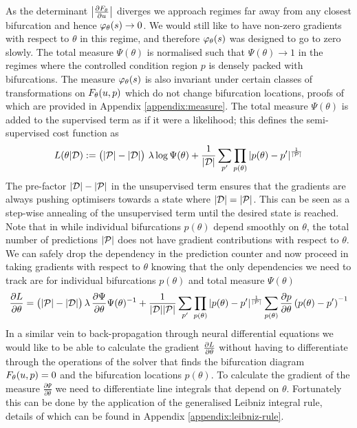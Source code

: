As the determinant $\left| \frac{\partial F_{\theta}}{\partial u} \right|$ diverges we approach regimes far away from any closest bifurcation and hence $\varphi_{\theta}(s)\rightarrow0$. We would still like to have non-zero gradients with respect to $\theta$ in this regime, and therefore $\varphi_{\theta}(s)$ was designed to go to zero slowly. The total measure $\Psi(\theta)$ is normalised such that $\Psi(\theta)\rightarrow1$ in the regimes where the controlled condition region $p$ is densely packed with bifurcations. The measure $\varphi_{\theta}(s)$ is also invariant under certain classes of transformations on $F_{\theta}(u,p)$ which do not change bifurcation locations, proofs of which are provided in Appendix \ref{appendix:measure}. The total measure $\Psi(\theta)$ is added to the supervised term as if it were a likelihood; this defines the semi-supervised cost function as
\begin{align}
    L(\theta|\mathcal{D}):=
    \big(|\mathcal{P}|-|\mathcal{D}|\big)\,\,\lambda \log\Psi(\theta)+
    \frac{1}{|\mathcal{D}|}\sum_{p'}
    \prod_{p(\theta)}|p(\theta)-p'|
    ^{\frac{1}{|\mathcal{P}|}}
    \label{eq:loss}
\end{align}
The pre-factor $|\mathcal{D}|-|\mathcal{P}|$ in the unsupervised term ensures that the gradients are always pushing optimisers towards a state where $|\mathcal{D}|=|\mathcal{P}|$. This can be seen as a step-wise annealing of the unsupervised term until the desired state is reached. Note that in while individual bifurcations $p(\theta)$ depend smoothly on $\theta$, the total number of predictions $|\mathcal{P}|$ does not have gradient contributions with respect to $\theta$. We can safely drop the dependency in the prediction counter and now proceed in taking gradients with respect to $\theta$ knowing that the only dependencies we need to track are for individual bifurcations $p(\theta)$ and total measure $\Psi(\theta)$
\begin{align}
    \frac{\partial L}{\partial\theta}=
    \big(|\mathcal{P}|-|\mathcal{D}|\big)\,\lambda\,
    \frac{\partial \Psi}{\partial\theta}\Psi(\theta)^{-1}+
    \frac{1}{|\mathcal{D}||\mathcal{P}|}\sum_{p'}
    \prod_{p(\theta)}|p(\theta)-p'|^{\frac{1}{|\mathcal{P}|}}
    \sum_{p(\theta)}\frac{\partial p}{\partial\theta}\left(p(\theta)-p'\right)^{-1}
    \label{eq:gradient-loss}
\end{align}
In a similar vein to back-propagation through neural differential equations \cite{Chen2018NeuralEquations} we would like to be able to calculate the gradient $\frac{\partial L}{\partial\theta}$ without having to differentiate through the operations of the solver that finds the bifurcation diagram $F_{\theta}(u,p)=0$ and the bifurcation locations $p(\theta)$. To calculate the gradient of the measure $\frac{\partial \Psi}{\partial\theta}$ we need to differentiate line integrals that depend on $\theta$. Fortunately this can be done by the application of the generalised Leibniz integral rule, details of which can be found in Appendix \ref{appendix:leibniz-rule}.

